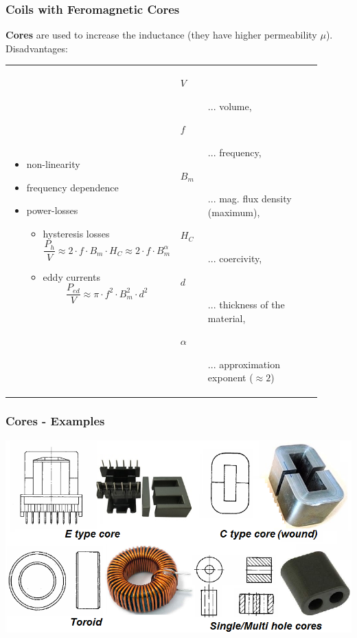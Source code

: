\documentclass{beamer}
\begin{document}
	\begin{frame}
	\frametitle{Coils with Feromagnetic Cores}
		\small
	\textbf{Cores} are used to increase the inductance (they have higher permeability $\mu$). Disadvantages:
	\begin{tabular}{m{0.45\linewidth} m{0.45\linewidth}}
	\begin{itemize}
		\item non-linearity
		\item frequency dependence
		\item power-losses
		\begin{itemize}
			\item hysteresis losses $$\frac{P_h}{V} \approx 2\cdot f\cdot B_m\cdot H_C \approx  2\cdot f\cdot B_m^\alpha$$
			\item eddy currents $$\frac{P_{ed}}{V} \approx \pi\cdot f^2\cdot B_m^2\cdot d^2 $$
		\end{itemize}
	\end{itemize}
	&
	\begin{description}
		\item[$V$]... volume,
	  \item[$f$]... frequency,
		\item[$B_m$]... mag. flux density (maximum),
		\item[$H_C$]... coercivity,
		\item[$d$]... thickness of the material,
		\item[$\alpha$]... approximation exponent ($\approx 2$)
	\end{description}
	\end{tabular}
  \end{frame}
	\begin{frame}
	\frametitle{Cores - Examples}
	\begin{center}
		\includegraphics[scale=0.4]{obr07_jadra.png}
	\end{center}
  \end{frame}
\end{document}
